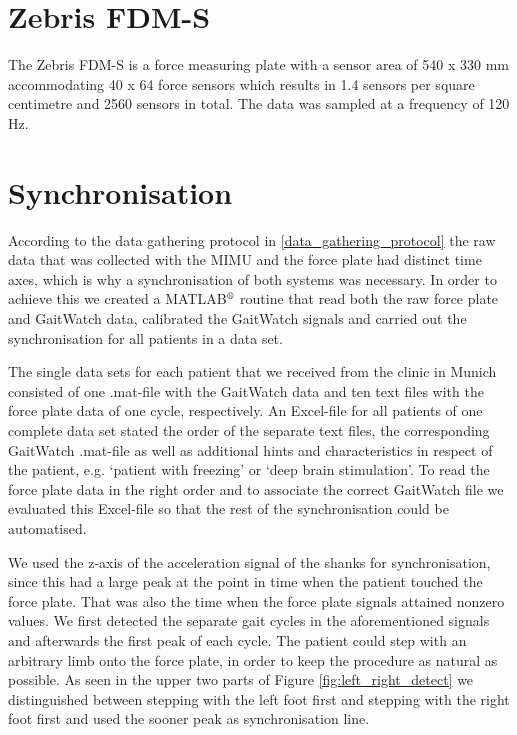 \section{Zebris FDM-S}

The Zebris FDM-S is a force measuring plate with a sensor area of 540 x 330 mm accommodating 40 x 64 force sensors which results in 1.4 sensors per square centimetre and 2560 sensors in total. The data was sampled at a frequency of 120 Hz.

\section{Synchronisation}

According to the data gathering protocol in \ref{data_gathering_protocol} the raw data that was collected with the MIMU and the force plate had distinct time axes, which is why a synchronisation of both systems was necessary. In order to achieve this we created a MATLAB$\textsuperscript{\textregistered}$ routine that read both the raw force plate and GaitWatch data, calibrated the GaitWatch signals and carried out the synchronisation for all patients in a data set.

The single data sets for each patient that we received from the clinic in Munich consisted of one .mat-file with the GaitWatch data and ten text files with the force plate data of one cycle, respectively. An Excel-file for all patients of one complete data set stated the order of the separate text files, the corresponding GaitWatch .mat-file as well as additional hints and characteristics in respect of the patient, e.g. `patient with freezing' or `deep brain stimulation'. To read the force plate data in the right order and to associate the correct GaitWatch file we evaluated this Excel-file so that the rest of the synchronisation could be automatised.

We used the z-axis of the acceleration signal of the shanks for synchronisation, since this had a large peak at the point in time when the patient touched the force plate. That was also the time when the force plate signals attained nonzero values.  We first detected the separate gait cycles in the aforementioned signals and afterwards the first peak of each cycle. The patient could step with an arbitrary limb onto the force plate, in order to keep the procedure as natural as possible. As seen in the upper two parts of Figure \ref{fig:left_right_detect} we distinguished between stepping with the left foot first and stepping with the right foot first and used the sooner peak as synchronisation line.

